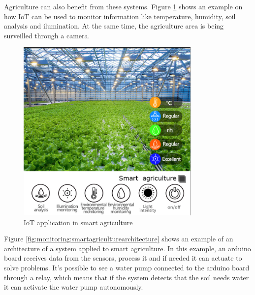 Agriculture can also benefit from these systems. Figure \ref{fig:monitoring:smartagriculture}
shows an example on how \gls{IoT} can be used to monitor information like
temperature, humidity, soil analysis and ilumination. At the same time, the
agriculture area is being surveilled through a camera.

\begin{figure}[H]
	\centering
	\includegraphics[width=0.8\textwidth, height=0.5\textheight, keepaspectratio]{Chapters/Figures/Monitoring/SmartAgriculture.png}
	\caption{\gls{IoT} application in smart agriculture\cite{hengko_smart_agriculture}}
	\label{fig:monitoring:smartagriculture}
\end{figure}

Figure \ref{fig:monitoring:smartagriculturearchitecture}
shows an example of an architecture of a system applied to smart agriculture.
In this example, an arduino board receives data from the sensors, process it
and if needed it can actuate to solve problems. It's possible to see a water
pump connected to the arduino board through a relay, which means that if the
system detects that the soil needs water it can activate the water pump
autonomously.

